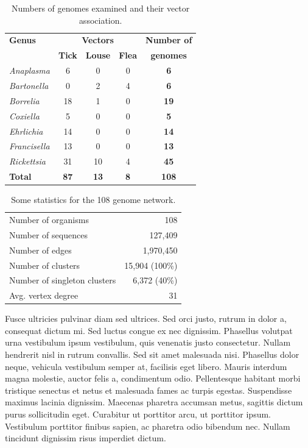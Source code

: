 \begin{table}[ht!]
\begin{center}
      \begin{tabular}{lcccc}
        \hline
\textbf{Genus} & \multicolumn{3}{c}{\textbf{Vectors}} & \textbf{Number of}\\ \cline{2-4}
{} & \textbf{Tick}  & \textbf{Louse}   & \textbf{Flea} &  \textbf{genomes}\\ 
\hline
\textit{Anaplasma} & 6 & 0 & 0 & \textbf{6} \\
\textit{Bartonella} & 0 & 2 & 4 & \textbf{6} \\
\textit{Borrelia} & 18 & 1 & 0 & \textbf{19}\\
\textit{Coxiella} & 5 & 0 & 0 & \textbf{5} \\
\textit{Ehrlichia} & 14 & 0 & 0 & \textbf{14} \\
\textit{Francisella} & 13 & 0 & 0 & \textbf{13}\\
\textit{Rickettsia} & 31 & 10 & 4 & \textbf{45}\\
\hline
\textbf{Total} & \textbf{87} & \textbf{13} & \textbf{8} & \textbf{108}\\
        \hline
      \end{tabular} 
\caption[Numbers of genomes examined and their vector association.]{Numbers of genomes examined and their vector association.}\label{table_vectors_108genomes}
\end{center}
\end{table}

\begin{table}[hb!]
\begin{center}
\begin{tabular}{lr}
\hline 
Number of organisms & 108 \\ 
Number of sequences & 127,409 \\ 
Number of edges & 1,970,450 \\ 
Number of clusters & 15,904 (100\%) \\ 
Number of singleton clusters & 6,372 (40\%) \\ 
Avg. vertex degree & 31 \\ 
\hline 
\end{tabular} 
\caption[Some statistics for the 108 genome network.]{Some statistics for the 108 genome network.}\label{table_stats_108_network}
\end{center}
\end{table}

Fusce ultricies pulvinar diam sed ultrices. Sed orci justo, rutrum in dolor a, consequat dictum mi. Sed luctus congue ex nec dignissim. Phasellus volutpat urna vestibulum ipsum vestibulum, quis venenatis justo consectetur. Nullam hendrerit nisl in rutrum convallis. Sed sit amet malesuada nisi. Phasellus dolor neque, vehicula vestibulum semper at, facilisis eget libero. Mauris interdum magna molestie, auctor felis a, condimentum odio. Pellentesque habitant morbi tristique senectus et netus et malesuada fames ac turpis egestas. Suspendisse maximus lacinia dignissim. Maecenas pharetra accumsan metus, sagittis dictum purus sollicitudin eget. Curabitur ut porttitor arcu, ut porttitor ipsum. Vestibulum porttitor finibus sapien, ac pharetra odio bibendum nec. Nullam tincidunt dignissim risus imperdiet dictum.

